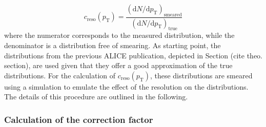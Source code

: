 \documentclass[12pt,a4paper]{report}
\begin{document}
\begin{equation}
c_\text{reso}(p_\text{T}) = \dfrac{(\text{d}N/\text{d}p_\text{T})_\text{smeared}}{(\text{d}N/\text{d}p_\text{T})_\text{true}}
\label{ptresfactor}
\end{equation}
where the numerator corresponds to the measured \pt distribution, while the denominator is a \pt distribution free of smearing. As starting point, the \pt distributions from the previous ALICE publication, depicted in Section (cite theo. section), are used  given that they offer a good approximation of the true \pt distributions. For the calculation of $c_\text{reso}(p_\text{T})$, these \pt distributions are smeared using a simulation to emulate the effect of the \pt resolution on the \pt distributions. The details of this procedure are outlined in the following.
\subsubsection{Calculation of the correction factor}
\end{document}

